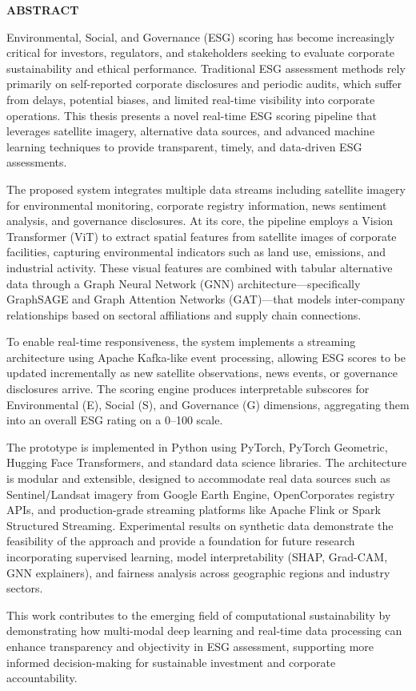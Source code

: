 \begin{center}
\huge{\textbf{ABSTRACT}}
\end{center}

\vspace{1cm}

Environmental, Social, and Governance (ESG) scoring has become increasingly critical for investors, regulators, and stakeholders seeking to evaluate corporate sustainability and ethical performance. Traditional ESG assessment methods rely primarily on self-reported corporate disclosures and periodic audits, which suffer from delays, potential biases, and limited real-time visibility into corporate operations. This thesis presents a novel real-time ESG scoring pipeline that leverages satellite imagery, alternative data sources, and advanced machine learning techniques to provide transparent, timely, and data-driven ESG assessments.

The proposed system integrates multiple data streams including satellite imagery for environmental monitoring, corporate registry information, news sentiment analysis, and governance disclosures. At its core, the pipeline employs a Vision Transformer (ViT) to extract spatial features from satellite images of corporate facilities, capturing environmental indicators such as land use, emissions, and industrial activity. These visual features are combined with tabular alternative data through a Graph Neural Network (GNN) architecture—specifically GraphSAGE and Graph Attention Networks (GAT)—that models inter-company relationships based on sectoral affiliations and supply chain connections.

To enable real-time responsiveness, the system implements a streaming architecture using Apache Kafka-like event processing, allowing ESG scores to be updated incrementally as new satellite observations, news events, or governance disclosures arrive. The scoring engine produces interpretable subscores for Environmental (E), Social (S), and Governance (G) dimensions, aggregating them into an overall ESG rating on a 0–100 scale.

The prototype is implemented in Python using PyTorch, PyTorch Geometric, Hugging Face Transformers, and standard data science libraries. The architecture is modular and extensible, designed to accommodate real data sources such as Sentinel/Landsat imagery from Google Earth Engine, OpenCorporates registry APIs, and production-grade streaming platforms like Apache Flink or Spark Structured Streaming. Experimental results on synthetic data demonstrate the feasibility of the approach and provide a foundation for future research incorporating supervised learning, model interpretability (SHAP, Grad-CAM, GNN explainers), and fairness analysis across geographic regions and industry sectors.

This work contributes to the emerging field of computational sustainability by demonstrating how multi-modal deep learning and real-time data processing can enhance transparency and objectivity in ESG assessment, supporting more informed decision-making for sustainable investment and corporate accountability.

